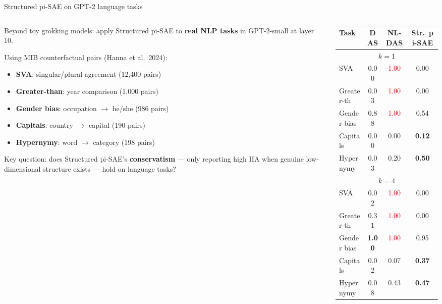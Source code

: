 \documentclass[aspectratio=169,11pt]{beamer}
\begin{document}
\begin{frame}{Structured pi-SAE on GPT-2 language tasks}

\begin{columns}[T]
\begin{column}{0.55\textwidth}
{\small Beyond toy grokking models: apply Structured pi-SAE to \textbf{real NLP tasks} in GPT-2-small at layer 10.}

\vspace{0.3em}
{\small Using MIB counterfactual pairs (Hanna et al.\ 2024):}
\begin{itemize}
  \item {\small \textbf{SVA}: singular/plural agreement (12,400 pairs)}
  \item {\small \textbf{Greater-than}: year comparison (1,000 pairs)}
  \item {\small \textbf{Gender bias}: occupation $\to$ he/she (986 pairs)}
  \item {\small \textbf{Capitals}: country $\to$ capital (190 pairs)}
  \item {\small \textbf{Hypernymy}: word $\to$ category (198 pairs)}
\end{itemize}

\vspace{0.3em}
{\small Key question: does Structured pi-SAE's \textbf{conservatism} --- only reporting high IIA when genuine low-dimensional structure exists --- hold on language tasks?}
\end{column}
\begin{column}{0.44\textwidth}
{\scriptsize\centering
\renewcommand{\arraystretch}{1.15}
\begin{tabular}{l|ccc}
\toprule
\textbf{Task} & \textbf{DAS} & \textbf{NL-DAS} & \textbf{Str.\ pi-SAE} \\
\midrule
\multicolumn{4}{c}{\textit{$k = 1$}} \\
\midrule
SVA        & 0.00 & \textcolor{red}{1.00} & 0.00 \\
Greater-th & 0.03 & \textcolor{red}{1.00} & 0.00 \\
Gender bias& 0.88 & \textcolor{red}{1.00} & 0.54 \\
Capitals   & 0.00 & 0.00 & \textbf{0.12} \\
Hypernymy  & 0.03 & 0.20 & \textbf{0.50} \\
\midrule
\multicolumn{4}{c}{\textit{$k = 4$}} \\
\midrule
SVA        & 0.02 & \textcolor{red}{1.00} & 0.00 \\
Greater-th & 0.31 & \textcolor{red}{1.00} & 0.00 \\
Gender bias& \textbf{1.00} & \textcolor{red}{1.00} & 0.95 \\
Capitals   & 0.02 & 0.07 & \textbf{0.37} \\
Hypernymy  & 0.08 & 0.43 & \textbf{0.47} \\
\bottomrule
\end{tabular}
}


\end{column}
\end{columns}
\end{frame}
\end{document}
